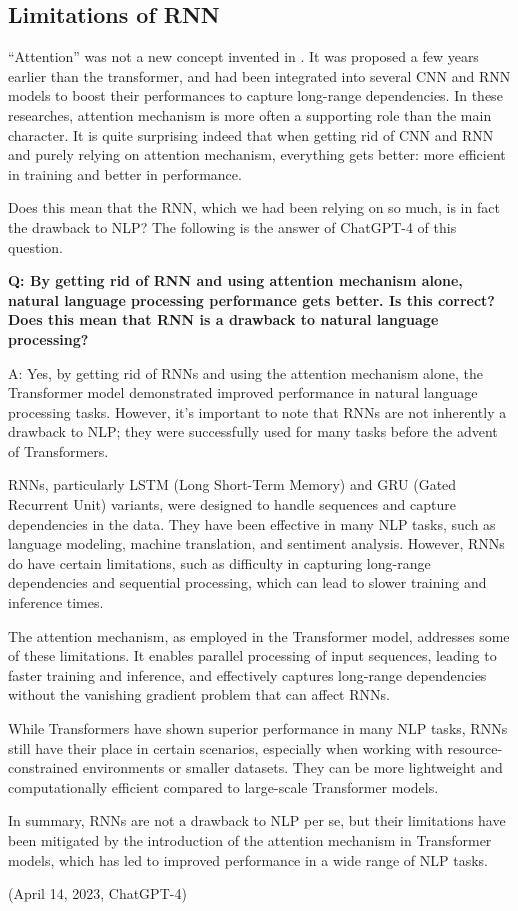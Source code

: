 \subsection{Limitations of RNN}

``Attention'' was not a new concept invented in \cite{vaswani2017attention}. It was proposed a few years earlier than the transformer, and had been integrated into several CNN and RNN models to boost their performances to capture long-range dependencies. In these researches, attention mechanism is more often a supporting role than the main character. It is quite surprising indeed that when getting rid of CNN and RNN and purely relying on attention mechanism, everything gets better: more efficient in training and better in performance.

Does this mean that the RNN, which we had been relying on so much, is in fact the drawback to NLP? The following is the answer of ChatGPT-4 of this question.

\begin{mdframed}
	\textbf{Q: By getting rid of RNN and using attention mechanism alone, natural language processing performance gets better. Is this correct? Does this mean that RNN is a drawback to natural language processing?}
	
	A: Yes, by getting rid of RNNs and using the attention mechanism alone, the Transformer model demonstrated improved performance in natural language processing tasks. However, it's important to note that RNNs are not inherently a drawback to NLP; they were successfully used for many tasks before the advent of Transformers.
	
	RNNs, particularly LSTM (Long Short-Term Memory) and GRU (Gated Recurrent Unit) variants, were designed to handle sequences and capture dependencies in the data. They have been effective in many NLP tasks, such as language modeling, machine translation, and sentiment analysis. However, RNNs do have certain limitations, such as difficulty in capturing long-range dependencies and sequential processing, which can lead to slower training and inference times.
	
	The attention mechanism, as employed in the Transformer model, addresses some of these limitations. It enables parallel processing of input sequences, leading to faster training and inference, and effectively captures long-range dependencies without the vanishing gradient problem that can affect RNNs.
	
	While Transformers have shown superior performance in many NLP tasks, RNNs still have their place in certain scenarios, especially when working with resource-constrained environments or smaller datasets. They can be more lightweight and computationally efficient compared to large-scale Transformer models.
	
	In summary, RNNs are not a drawback to NLP per se, but their limitations have been mitigated by the introduction of the attention mechanism in Transformer models, which has led to improved performance in a wide range of NLP tasks.
	
	(April 14, 2023, ChatGPT-4)
\end{mdframed}


